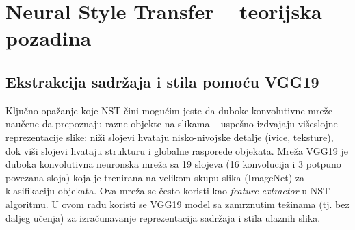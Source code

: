 \documentclass[a4paper,12pt]{article}
\begin{document}
\section{Neural Style Transfer -- teorijska pozadina}
\subsection{Ekstrakcija sadržaja i stila pomoću VGG19}
Ključno opažanje koje NST čini mogućim jeste da duboke konvolutivne mreže -- naučene da prepoznaju razne objekte na slikama -- uspešno izdvajaju višeslojne reprezentacije slike: niži slojevi hvataju nisko-nivojske detalje (ivice, teksture), dok viši slojevi hvataju strukturu i globalne rasporede objekata. Mreža VGG19 je duboka konvolutivna neuronska mreža sa 19 slojeva (16 konvolucija i 3 potpuno povezana sloja) koja je trenirana na velikom skupu slika (ImageNet) za klasifikaciju objekata. Ova mreža se često koristi kao \emph{feature extractor} u NST algoritmu. U ovom radu koristi se VGG19 model sa zamrznutim težinama (tj. bez daljeg učenja) za izračunavanje reprezentacija sadržaja i stila ulaznih slika.
\end{document}

